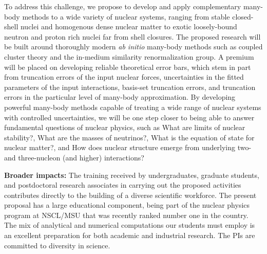 To address this challenge, we propose to develop and apply
complementary many-body methods to a wide variety of nuclear systems,
ranging from stable closed-shell nuclei and homogenous dense nuclear
matter to exotic loosely-bound neutron and proton rich nuclei far from
shell closures. The proposed research will be built around thoroughly
modern \emph{ab initio} many-body methods such as coupled cluster
theory and the in-medium similarity renormalization group.  A premium
will be placed on developing reliable theoretical error bars, which
stem in part from truncation errors of the input nuclear forces,
uncertainties in the fitted parameters of the input interactions,
basis-set truncation errors, and truncation errors in the particular
level of many-body approximation.  By developing powerful many-body
methods capable of treating a wide range of nuclear systems with
controlled uncertainties, we will be one step closer to being able to
answer fundamental questions of nuclear physics, such as What are
limits of nuclear stability?, What are the masses of neutrinos?, What
is the equation of state for nuclear matter?, and How does nuclear
structure emerge from underlying two- and three-nucleon (and higher)
interactions?

{\bf Broader impacts:} The training received by undergraduates,
graduate students, and postdoctoral research associates in carrying
out the proposed activities contributes directly to the building of a
diverse scientific workforce. The present proposal has a large
educational component, being part of the nuclear physics program at
NSCL/MSU that was recently ranked number one in the country. The mix
of analytical and numerical computations our students must employ is
an excellent preparation for both academic and industrial research. The
PIs are committed to diversity in science.





